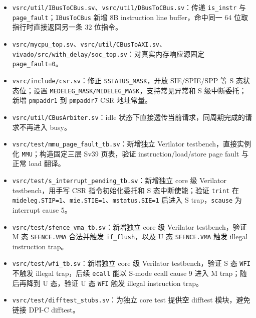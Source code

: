 \documentclass[UTF8,a4paper,11pt]{ctexart}
\begin{document}
\begin{itemize}
  \item \texttt{vsrc/util/IBusToCBus.sv}、\texttt{vsrc/util/DBusToCBus.sv}：传递 \texttt{is\_instr} 与 \texttt{page\_fault}；\texttt{IBusToCBus} 新增 8B instruction line buffer，命中同一 64 位取指行时直接返回另一条 32 位指令。
  \item \texttt{vsrc/mycpu\_top.sv}、\texttt{vsrc/util/CBusToAXI.sv}、\texttt{vivado/src/with\_delay/soc\_top.sv}：对真实内存响应源固定 \texttt{page\_fault=0}。
  \item \texttt{vsrc/include/csr.sv}：修正 \texttt{SSTATUS\_MASK}，开放 SIE/SPIE/SPP 等 S 态状态位；设置 \texttt{MEDELEG\_MASK/MIDELEG\_MASK}，支持常见异常和 S 级中断委托；新增 \texttt{pmpaddr1} 到 \texttt{pmpaddr7} CSR 地址常量。
  \item \texttt{vsrc/util/CBusArbiter.sv}：idle 状态下直接透传当前请求，同周期完成的请求不再进入 busy。
  \item \texttt{vsrc/test/mmu\_page\_fault\_tb.sv}：新增独立 Verilator testbench，直接实例化 \texttt{MMU}；构造固定三层 Sv39 页表，验证 instruction/load/store page fault 与正常 load 翻译。
  \item \texttt{vsrc/test/s\_interrupt\_pending\_tb.sv}：新增独立 core 级 Verilator testbench，用手写 CSR 指令初始化委托和 S 态中断使能；验证 \texttt{trint} 在 \texttt{mideleg.STIP=1}、\texttt{mie.STIE=1}、\texttt{mstatus.SIE=1} 后进入 S trap，\texttt{scause} 为 interrupt cause 5。
  \item \texttt{vsrc/test/sfence\_vma\_tb.sv}：新增独立 core 级 Verilator testbench，验证 M 态 \texttt{SFENCE.VMA} 合法并触发 \texttt{if\_flush}，以及 U 态 \texttt{SFENCE.VMA} 触发 illegal instruction trap。
  \item \texttt{vsrc/test/wfi\_tb.sv}：新增独立 core 级 Verilator testbench，验证 S 态 \texttt{WFI} 不触发 illegal trap，后续 \texttt{ecall} 能以 S-mode ecall cause 9 进入 M trap；随后再降到 U 态，验证 U 态 \texttt{WFI} 触发 illegal instruction trap。
  \item \texttt{vsrc/test/difftest\_stubs.sv}：为独立 core test 提供空 difftest 模块，避免链接 DPI-C difftest。

\end{itemize}
\end{document}

